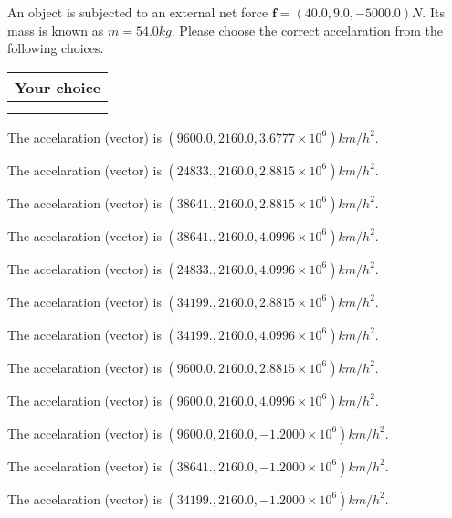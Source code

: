 \documentclass[12pt]{article}
\begin{document}
  
 
An object is subjected to an external net force $\mathbf{f}=(
40.0 ,
9.0,
-5000.0  )N$. Its mass is known as
$m= %
54.0  kg$. Please choose the correct accelaration
from the following choices.
 
  
  
\noindent\hspace{3.0in} \begin{tabular}{|l|}
\hline
Your choice \\
\hline
 \\ 
 \\ 
\hline
\end{tabular}
  
  
 
 
The accelaration (vector) is
$(
9600.0,
2160.0 ,
3.6777 \times 10^{6}
)km/h^2.
$
 
 
The accelaration (vector) is
$(
24833.,
2160.0 ,
2.8815 \times 10^{6}
)km/h^2.
$
 
 
The accelaration (vector) is
$(
38641.,
2160.0 ,
2.8815 \times 10^{6}
)km/h^2.
$
 
 
The accelaration (vector) is
$(
38641.,
2160.0 ,
4.0996 \times 10^{6}
)km/h^2.
$
 
 
The accelaration (vector) is
$(
24833.,
2160.0 ,
4.0996 \times 10^{6}
)km/h^2.
$
 
 
The accelaration (vector) is
$(
34199.,
2160.0 ,
2.8815 \times 10^{6}
)km/h^2.
$
 
 
The accelaration (vector) is
$(
34199.,
2160.0 ,
4.0996 \times 10^{6}
)km/h^2.
$
 
 
The accelaration (vector) is
$(
9600.0,
2160.0 ,
2.8815 \times 10^{6}
)km/h^2.
$
 
 
The accelaration (vector) is
$(
9600.0,
2160.0 ,
4.0996 \times 10^{6}
)km/h^2.
$
 
 
The accelaration (vector) is
$(
9600.0,
2160.0 ,
-1.2000 \times 10^{6}
)km/h^2.
$
 
 
The accelaration (vector) is
$(
38641.,
2160.0 ,
-1.2000 \times 10^{6}
)km/h^2.
$
 
 
The accelaration (vector) is
$(
34199.,
2160.0 ,
-1.2000 \times 10^{6}
)km/h^2.
$
 
\end{document}
